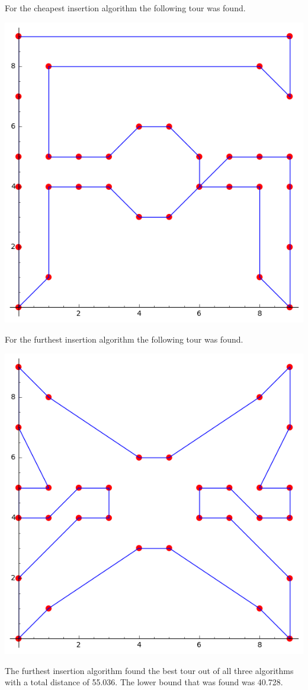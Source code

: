 \documentclass[11pt, oneside]{article}
\begin{document}
\begin{enumerate}
\begin{center}
    \end{center}
    For the cheapest insertion algorithm the following tour was found.
    \begin{center}
      \includegraphics[scale=.5]{Figures/final_2.png}
    \end{center}
    For the furthest insertion algorithm the following tour was found.
    \begin{center}
      \includegraphics[scale=.5]{Figures/final_3.png}
    \end{center}
    The furthest insertion algorithm found the best tour out of all three
    algorithms with a total distance of 55.036.
    The lower bound that was found was 40.728.


\end{enumerate}
\end{document}
